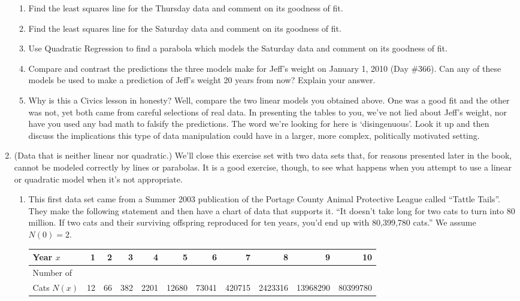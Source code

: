 \begin{enumerate}
\begin{enumerate}
\item Find the least squares line for the Thursday data and comment on its goodness of fit.
\item Find the least squares line for the Saturday data and comment on its goodness of fit.
\item Use Quadratic Regression to find a parabola which models the Saturday data and comment on its goodness of fit.
\item Compare and contrast the predictions the three models make for Jeff's weight on January 1, 2010 (Day \#366).  Can any of these models be used to make a prediction of Jeff's weight 20 years from now?  Explain your answer.
\item Why is this a Civics lesson in honesty?  Well, compare the two linear models you obtained above.  One was a good fit and the other was not, yet both came from careful selections of real data.  In presenting the tables to you, we've  not lied about Jeff's weight, nor have you used any bad math to falsify the predictions.  The word we're looking for here is `disingenuous'.  Look it up and then discuss the implications this type of data manipulation could have in a larger, more complex, politically motivated setting.  

\end{enumerate}

\item (Data that is neither linear nor quadratic.)  We'll close this exercise set with two data sets that, for reasons presented later in the book, cannot be modeled correctly by lines or parabolas.  It is a good exercise, though, to see what happens when you attempt to use a linear or quadratic model when it's not appropriate.

\begin{enumerate}

\item \label{APLcats} This first data set came from a Summer 2003 publication of the Portage County Animal Protective League called ``Tattle Tails''.  They make the following statement and then have a chart of data that supports it. ``It doesn't take long for two cats to turn into 80 million.  If two cats and their surviving offspring reproduced for ten years, you'd end up with 80,399,780 cats.''  We assume $N(0) = 2$.

\medskip

\scriptsize

\noindent \begin{tabular}{|l|r|r|r|r|r|r|r|r|r|r|} \hline
Year $x$ & 1 & 2 & 3 & 4 & 5 & 6 & 7 & 8 & 9 & 10 \\ 
\hline 
Number of  & & & & & & & & & & \\
Cats $N(x)$ & 12 & 66 & 382 & 2201 & 12680 & 73041 & 420715 & 2423316 & 13968290 & 80399780 \\ \hline
\end{tabular}


\end{enumerate}
\end{enumerate}
